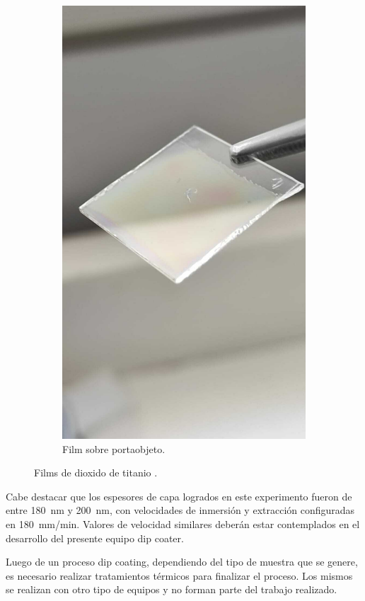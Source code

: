 \begin{figure}[!htpb]
\begin{subfigure}[b]{0.4\textwidth}
         \includegraphics[width=.7\textwidth]{./Figures/muestra_2.pdf}
         \caption{Film sobre portaobjeto.}
         \label{fig:muestra_"}
     \end{subfigure}
     \hfill
        \caption{Films de dioxido de titanio  \protect\footnotemark.}
        \label{fig:muestras}
\end{figure}



Cabe destacar que los espesores de capa logrados en este experimento fueron de entre \SI{180}{nm} y \SI{200}{nm}, con velocidades de inmersión y extracción configuradas en \SI{180}{mm/min}. Valores de velocidad similares deberán estar contemplados en el desarrollo del presente equipo dip coater.

Luego de un proceso dip coating, dependiendo del tipo de muestra que se genere, es necesario realizar tratamientos térmicos para finalizar el proceso. Los mismos se realizan con otro tipo de equipos y no forman parte del trabajo realizado.
 
